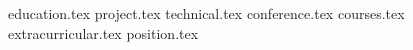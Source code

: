 \documentclass[11pt, a4paper]{awesome-cv}
\newcommand*{\sectiondir}{resume/}
\begin{document}
\makecvheader
  
{education.tex}
{project.tex}
{technical.tex}
{conference.tex}
{courses.tex}
{extracurricular.tex}
{position.tex}
\end{document}
